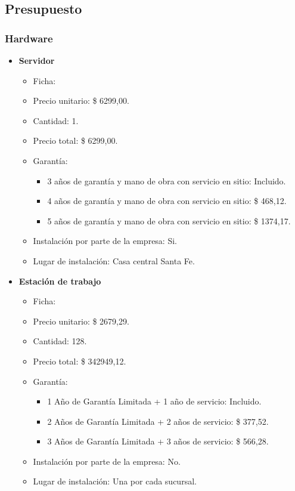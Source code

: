 \subsection{Presupuesto}

\subsubsection{Hardware}
\begin{itemize}
  \item \textbf{Servidor}
    \begin{itemize}
      \item Ficha:
      \item Precio unitario: \$ 6299,00.
      \item Cantidad: 1.
      \item Precio total: \$ 6299,00.
      \item Garantía:
        \begin{itemize}
          \item 3 años de garantía y mano de obra con servicio en sitio: Incluido.
          \item 4 años de garantía y mano de obra con servicio en sitio: \$  468,12.
          \item 5 años de garantía y mano de obra con servicio en sitio: \$ 1374,17.
        \end{itemize}
      \item Instalación por parte de la empresa: Si.
      \item Lugar de instalación: Casa central Santa Fe.
    \end{itemize}
  
  \item \textbf{Estación de trabajo}
    \begin{itemize}
      \item Ficha:
      \item Precio unitario: \$ 2679,29.
      \item Cantidad: 128.
      \item Precio total: \$ 342949,12.
      
      \item Garantía:
        \begin{itemize}
          \item 1 Año de Garantía Limitada + 1 año de servicio: Incluido.
          \item 2 Años de Garantía Limitada + 2 años de servicio: \$ 377,52.
          \item 3 Años de Garantía Limitada + 3 años de servicio: \$ 566,28.
        \end{itemize}
      \item Instalación por parte de la empresa: No.
      \item Lugar de instalación: Una por cada sucursal.
    \end{itemize}
  

\end{itemize}
